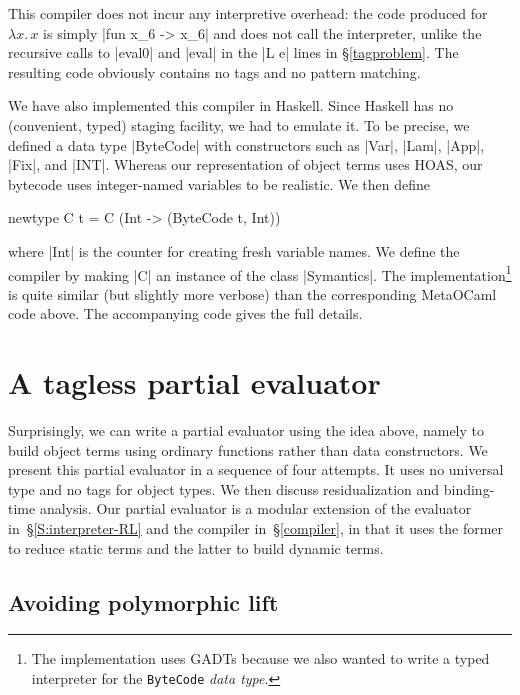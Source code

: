 \documentclass[preprint]{sigplanconf}
\newcommand{\fun}[1]{\mathopen{\lambda\mathord{#1}.\,}}
\begin{document}
This compiler does not incur
any interpretive overhead: the
code produced for $\fun{x}x$ is simply |fun x_6 -> x_6| and does not
  call the interpreter, unlike the recursive calls to |eval0| and
  |eval| in the |L e| lines in \S\ref{tagproblem}.
The resulting code obviously contains no tags and no pattern matching.

We have also implemented this compiler in Haskell. Since Haskell
has no (convenient, typed) staging facility, we had to emulate
it. To be precise, we defined a data type |ByteCode| with
constructors such as |Var|, |Lam|, |App|, |Fix|, and |INT|.
Whereas our representation of object terms uses HOAS,
our bytecode uses integer-named
variables to be realistic. We then define 
\begin{code}
newtype C t = C (Int -> (ByteCode t, Int)) 
\end{code}
where |Int| is the counter for creating fresh variable
names. We define the compiler by making |C| an instance of the
class |Symantics|. The implementation\footnote{The implementation uses
GADTs because we also wanted to write a typed interpreter for 
the \texttt{ByteCode} \emph{data type}.} is quite similar (but slightly more
verbose) than the corresponding MetaOCaml code above. The
accompanying code gives the full details.

\section{A tagless partial evaluator}\label{PE}

Surprisingly, we can write a partial evaluator using the idea above,
namely to build object terms using ordinary functions rather than data
constructors.  We present this partial evaluator in a sequence of four
attempts. It uses no universal type and no tags
for object types.  We then discuss residualization and binding-time
analysis.  Our partial evaluator is a modular extension of the evaluator
in~\S\ref{S:interpreter-RL} and the compiler in~\S\ref{compiler}, in
that it uses the former to reduce static terms and the latter to build
dynamic terms.

\subsection{Avoiding polymorphic lift}
\label{S:PE-lift}
\end{document}
